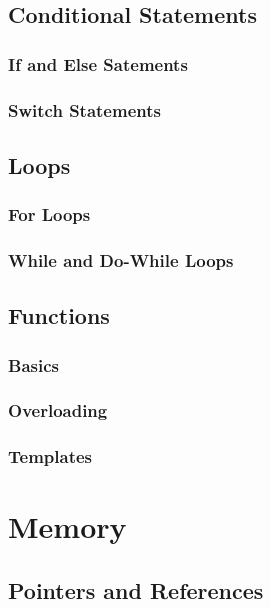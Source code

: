 \documentclass[11pt,fancy,authoryear]{elegantbook}
\begin{document}
\section{Conditional Statements}

\subsection{If and Else Satements}

\subsection{Switch Statements}

\section{Loops}

\subsection{For Loops}

\subsection{While and Do-While Loops}

\section{Functions}

\subsection{Basics}

\subsection{Overloading}

\subsection{Templates}

\chapter{Memory}

\section{Pointers and References}
\end{document}
